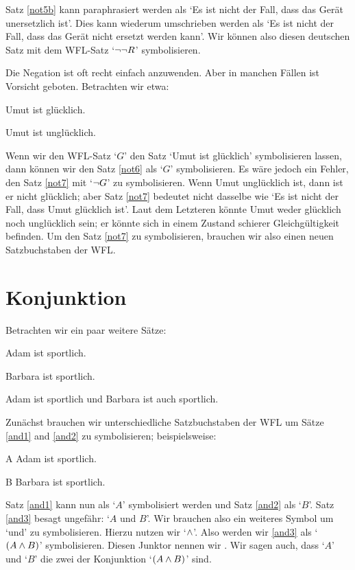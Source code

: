 Satz \ref{not5b} kann paraphrasiert werden als `Es ist nicht der Fall, dass das Gerät unersetzlich ist'. Dies kann wiederum umschrieben werden als `Es ist nicht der Fall, dass das Gerät nicht ersetzt werden kann'. Wir können also diesen deutschen Satz mit dem WFL-Satz `$\neg\neg R$' symbolisieren.

Die Negation ist oft recht einfach anzuwenden. Aber in manchen Fällen ist Vorsicht geboten. Betrachten wir etwa:
	\begin{earg}
		\item[\ex{not6}] Umut ist glücklich.
		\item[\ex{not7}] Umut ist unglücklich.
	\end{earg}
Wenn wir den WFL-Satz `$G$' den Satz `Umut ist glücklich' symbolisieren lassen, dann können wir den Satz \ref{not6} als `$G$' symbolisieren. Es wäre jedoch ein Fehler, den Satz \ref{not7} mit `$\neg{G}$' zu symbolisieren. Wenn Umut unglücklich ist, dann ist er nicht glücklich; aber Satz \ref{not7} bedeutet nicht dasselbe wie `Es ist nicht der Fall, dass Umut glücklich ist'. Laut dem Letzteren könnte Umut weder glücklich noch unglücklich sein; er könnte sich in einem Zustand schierer Gleichgültigkeit befinden. Um den Satz \ref{not7} zu symbolisieren, brauchen wir also einen neuen Satzbuchstaben der WFL.


\section{Konjunktion}
\label{s:ConnectiveConjunction}

Betrachten wir ein paar weitere Sätze:
	\begin{earg}
		\item[\ex{and1}]Adam ist sportlich.
		\item[\ex{and2}]Barbara ist sportlich.
		\item[\ex{and3}]Adam ist sportlich und Barbara ist auch sportlich.
	\end{earg}
Zunächst brauchen wir unterschiedliche Satzbuchstaben der WFL um Sätze \ref{and1} and \ref{and2} zu symbolisieren; beispielsweise:
	\begin{ekey}
		\item[A] Adam ist sportlich.
		\item[B] Barbara ist sportlich.
	\end{ekey}
Satz \ref{and1} kann nun als `$A$' symbolisiert werden und Satz \ref{and2} als `$B$'. Satz \ref{and3} besagt ungefähr: `$A$ und $B$'. Wir brauchen also ein weiteres Symbol um `und' zu symbolisieren. Hierzu nutzen wir `$\wedge$'. Also werden wir \ref{and3} als `$(A\wedge B)$' symbolisieren. Diesen Junktor nennen wir . Wir sagen auch, dass `$A$' und `$B$' die zwei  der Konjunktion `$(A \wedge B)$' sind.

